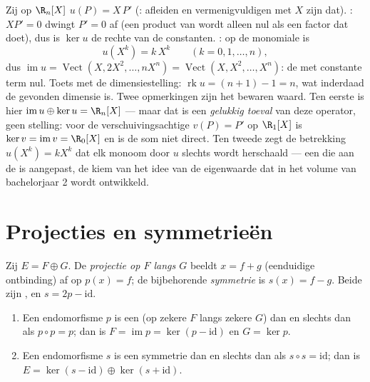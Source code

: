 \begin{example}
\label{ex:b1:linmaps:euler}
Zij op $\R_n[X]$ $u(P) = X\,P'$ (: afleiden en
vermenigvuldigen met $X$ zijn dat). \emph{}: $XP' = 0$ dwingt
$P' = 0$ af (een product van  wordt alleen nul als een
factor dat doet), dus is $\ker u$ de rechte van de constanten.
\emph{}: op de monomiale  is
\[
u(X^k) = k\,X^{k} \qquad (k = 0, 1, \dots, n),
\]
dus $\operatorname{im} u = \operatorname{Vect}(X, 2X^2, \dots,
nX^n) = \operatorname{Vect}(X, X^2, \dots, X^n)$: de 
met constante term nul. Toets met de dimensiestelling:
$\operatorname{rk} u = (n + 1) - 1 = n$, wat inderdaad de gevonden
dimensie is. Twee opmerkingen zijn het bewaren waard. Ten eerste
is hier $\operatorname{im} u \oplus \ker u = \R_n[X]$ --- maar dat
is een \emph{gelukkig toeval} van deze operator, geen stelling:
voor de verschuivingsachtige $v(P) = P'$ op $\R_1[X]$ is $\ker v =
\operatorname{im} v = \R_0[X]$ en is de som niet direct. Ten
tweede zegt de betrekking $u(X^k) = kX^k$ dat elk monoom door $u$
slechts wordt herschaald --- een  die aan de  is
aangepast, de kiem van het idee van de eigenwaarde dat in het
volume van bachelorjaar 2 wordt ontwikkeld.
\end{example}

\section{Projecties en symmetrieën}

\begin{definition}\label{def:b1:linmaps:projection}
Zij $E = F \oplus G$. De \emph{projectie op $F$ langs
$G$} beeldt $x = f + g$ (eenduidige ontbinding) af
op $p(x) = f$; de bijbehorende \emph{symmetrie} is
$s(x) = f - g$. Beide zijn , en $s = 2p - \mathrm{id}$.
\end{definition}

\begin{theorem}\label{thm:b1:linmaps:projchar}
\begin{enumerate}
  \item Een endomorfisme $p$ is een  (op zekere $F$ langs
        zekere $G$) dan en slechts dan als $p \circ p = p$; dan is
        $F = \operatorname{im} p = \ker(p - \mathrm{id})$ en $G =
        \ker p$.
  \item Een endomorfisme $s$ is een symmetrie dan en slechts dan als
        $s \circ s = \mathrm{id}$; dan is $E = \ker(s - \mathrm{id})
        \oplus \ker(s + \mathrm{id})$.
\end{enumerate}
\end{theorem}

